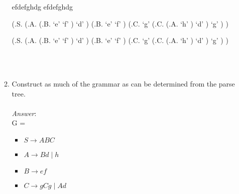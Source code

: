 \documentclass[fleqn]{article}
\begin{document}
\begin{enumerate}
\begin{enumerate}
    efdefghdg \hspace{0.4\textwidth} efdefghdg\\
    \begin{parsetree}
      (.S.
        (.A.
          (.B.
            `e'
            `f'
          )
          `d'
        )
        (.B.
          `e'
          `f'
        )
        (.C.
          `g'
          (.C.
            (.A.
              `h'
            )
            `d'
          )
          `g'
        )
      )
    \end{parsetree}
    \hspace{0.1\textwidth}
    \begin{parsetree}
      (.S.
        (.A.
          (.B.
            `e'
            `f'
          )
          `d'
        )
        (.B.
          `e'
          `f'
        )
        (.C.
          `g'
          (.C.
            (.A.
              `h'
            )
            `d'
          )
          `g'
        )
      )
    \end{parsetree}\\\\

    \newpage
    \item Construct as much of the grammar as can be determined from the parse tree.\\\\
    \textit{Answer}:\\
    G =
    \begin{itemize}
      \item $S \rightarrow ABC$
      \item $A \rightarrow Bd\; |\; h$
      \item $B \rightarrow ef$
      \item $C \rightarrow gCg\; |\; Ad$
    \end{itemize}

  \end{enumerate}
  

\end{enumerate}
\end{document}
